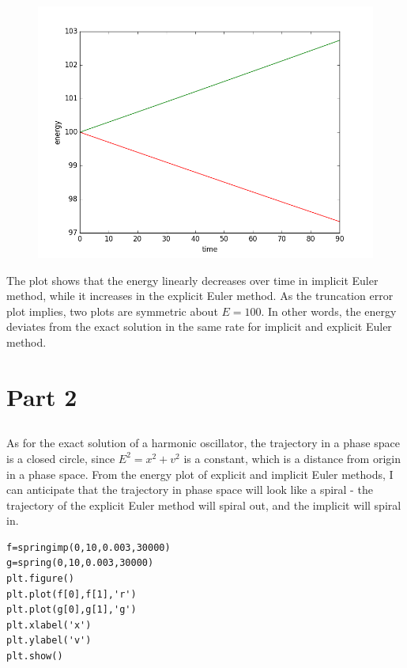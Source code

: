 \documentclass[10pt]{article}
\begin{document}
\begin{figure}[!h]
\centering
\includegraphics[scale=0.5]{w3fig8.png}
\end{figure}

The plot shows that the energy linearly decreases over time in implicit Euler method, while it increases in the explicit Euler method. As the truncation error plot implies, two plots are symmetric about $E = 100$. In other words, the energy deviates from the exact solution in the same rate for implicit and explicit Euler method.\\
\newpage

\section{Part 2}
\subsection{}
As for the exact solution of a harmonic oscillator, the trajectory in a phase space is a closed circle, since $E^2 = x^2 + v^2$ is a constant, which is a distance from origin in a phase space. From the energy plot of explicit and implicit Euler methods, I can anticipate that the trajectory in phase space will look like a spiral - the trajectory of the explicit Euler method will spiral out, and the implicit will spiral in.\\

\begin{lstlisting}
f=springimp(0,10,0.003,30000)
g=spring(0,10,0.003,30000)
plt.figure()
plt.plot(f[0],f[1],'r')
plt.plot(g[0],g[1],'g')
plt.xlabel('x')
plt.ylabel('v')
plt.show()
\end{lstlisting}
 
\end{document}
